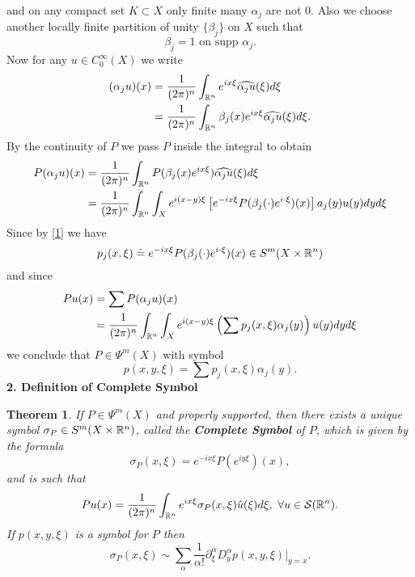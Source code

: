 \documentclass[12pt,reqno]{amsart}
\theoremstyle{plain}  %
\newtheorem{theorem}{Theorem}
\theoremstyle{definition}
\newcommand{\nin}{\noindent}
\begin{document}
and on any compact set $ K \subset X $ only finite many $ \alpha_j $ are not $ 0.$
Also we choose another locally finite partition of unity $ \{\beta_j\} $ on $ X $
such that 
$$\beta_j = 1 \text{ on supp } \alpha_j.$$
Now for any $ u \in C^\infty_0 (X) $ we write
\begin{equation*}
\begin{split}
(\alpha_j u) (x) &= \frac{1}{(2 \pi)^n} \int_{\Bbb R^n} e^{i x \xi}
\widehat{\alpha_j u} (\xi) d \xi\\
&= \frac{1}{(2 \pi)^n} \int_{\Bbb R^n} \beta_j (x) e^{i x \xi} \widehat{\alpha_j
u} (\xi) d \xi. \end{split}
\end{equation*}
By the continuity of $ P $ we pass $ P $ inside the integral to obtain
\begin{equation*}
\begin{split}
P(\alpha_j u) (x) &= \frac{1}{(2 \pi)^n} \int_{\Bbb R^n} P(\beta_j (x) e^{i x \xi})
\widehat{\alpha_j u} (\xi) d \xi\\
&= \frac{1}{(2 \pi)^n} \int_{\Bbb R^n} \int_X e^{i(x-y)\xi} \left [ e^{-ix \xi}
P(\beta_j (\cdot) e^{i \cdot \xi} ) (x) \right ] a_j (y) u (y) dy d\xi \end{split}
\end{equation*}
Since by \eqref{1} we have
$$p_j(x, \xi) \doteq e^{-ix \xi} P(\beta_j (\cdot) e^{i \cdot \xi}) (x) \in S^m (X
\times \Bbb R^n)$$
and since
\begin{equation*}
\begin{split}
Pu(x) &= \sum P(\alpha_j u)(x)\\
&= \frac{1}{(2 \pi)^n} \int_{\Bbb R^n} \int_X e^{i(x-y) \xi} \left ( \sum p_j(x,
\xi) \alpha_j (y) \right ) u(y) dy d \xi \end{split}
\end{equation*}
we conclude that $ P \in \Psi^m(X) $ with symbol
$$p(x, y, \xi) = \sum p_j (x, \xi) \alpha_j (y).$$
\vskip0.1in
\nin
{\bf 2. Definition of Complete Symbol}
\begin{theorem}
	\label{thm2}
	If $ P \in \Psi^m(X) $ and properly supported, 
then there exists a
unique symbol $ \sigma_P \in S^m (X \times \Bbb R^n) $,
called the {\bf  Complete Symbol} of $P$, which is given by the formula
$$\sigma_P (x, \xi) = e^{-i x \xi} P(e^{iy \xi} )(x), $$
and  is  such that 
\begin{equation}
	\label{3}
	Pu(x) = \frac{1}{(2 \pi)^n} \int_{\Bbb R^n} e^{i x \xi} \sigma_P (x, \xi) \hat
	u(\xi) d \xi, \ \forall u \in \mathcal{S}(\Bbb R^n).
\end{equation}
If $ p(x, y, \xi) $ is a symbol for $ P $ then
\begin{equation}
	\label{4}
	\sigma_P (x, \xi) \sim \sum_\alpha \frac{1}{\alpha !} \partial^\alpha_\xi
D^\alpha_y p(x, y, \xi) \big |_{y=x}. 
\end{equation}
\end{theorem}
\end{document}
